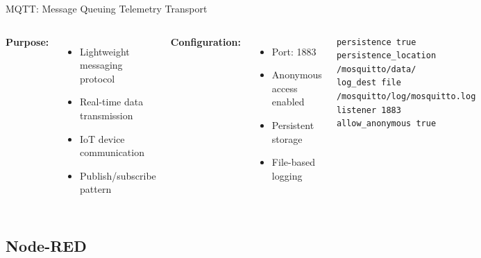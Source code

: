 \documentclass[aspectratio=169]{beamer}
\begin{document}
\begin{frame}{MQTT: Message Queuing Telemetry Transport}
\begin{columns}
\textbf{Purpose:}
\begin{itemize}
    \item Lightweight messaging protocol
    \item Real-time data transmission
    \item IoT device communication
    \item Publish/subscribe pattern
\end{itemize}

\textbf{Configuration:}
\begin{itemize}
    \item Port: 1883
    \item Anonymous access enabled
    \item Persistent storage
    \item File-based logging
\end{itemize}

\begin{center}
\begin{lstlisting}[language=text]
persistence true
persistence_location /mosquitto/data/
log_dest file /mosquitto/log/mosquitto.log
listener 1883
allow_anonymous true
\end{lstlisting}
\end{center}
\end{columns}
\end{frame}

\subsection{Node-RED}
\end{document}
